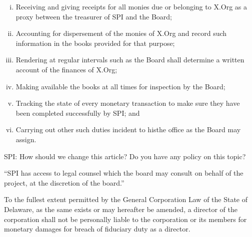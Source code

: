 \documentclass[10pt, english]{bylaws}
\begin{document}
\begin{enumerate}[(i)\hspace{.2cm}]
	\item Receiving and giving receipts for all monies due or belonging to
	X.Org as a proxy between the treasurer of SPI and the Board;

	\item Accounting for dispersement of the monies of X.Org and record such
	information in the books provided for that purpose;

	\item Rendering at regular intervals such as the Board shall determine a
	written account of the finances of X.Org;

	\item Making available the books at all times for inspection by the
	Board;

	\item Tracking the state of every monetary transaction to make sure
	they have been completed successfully by SPI; and

	\item Carrying out other such duties incident to histhe office as the
	Board may assign.
\end{enumerate}


SPI: How should we change this article? Do you have any policy on this topic?

``SPI has access to legal counsel which the board may consult on behalf of the
project, at the discretion of the board.''

To the fullest extent permitted by the General Corporation Law of the State of
Delaware, as the same exists or may hereafter be amended, a director of the
corporation shall not be personally liable to the corporation or its members for
monetary damages for breach of fiduciary duty as a director.
\end{document}
